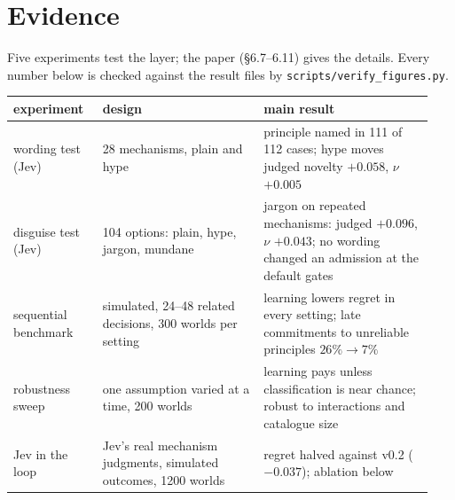 \documentclass[11pt]{article}
\begin{document}
\section{Evidence}

Five experiments test the layer; the paper (\S6.7--6.11) gives the details. Every number below is
checked against the result files by \texttt{scripts/verify\_figures.py}.

\begin{table}[h]
\centering\small
\setlength{\tabcolsep}{4pt}
\begin{tabular}{@{}p{0.2\linewidth}p{0.36\linewidth}p{0.38\linewidth}@{}}
\toprule
experiment & design & main result \\
\midrule
wording test (Jev) & 28 mechanisms, plain and hype & principle named in 111 of 112 cases; hype moves
judged novelty $+0.058$, $\nu$ $+0.005$ \\
disguise test (Jev) & 104 options: plain, hype, jargon, mundane & jargon on repeated mechanisms:
judged $+0.096$, $\nu$ $+0.043$; no wording changed an admission at the default gates \\
sequential benchmark & simulated, 24--48 related decisions, 300 worlds per setting & learning lowers
regret in every setting; late commitments to unreliable principles $26\%\to7\%$ \\
robustness sweep & one assumption varied at a time, 200 worlds & learning pays unless classification
is near chance; robust to interactions and catalogue size \\
Jev in the loop & Jev's real mechanism judgments, simulated outcomes, 1200 worlds & regret halved
against v0.2 ($-0.037$); ablation below \\
\bottomrule
\end{tabular}
\end{table}
\end{document}
